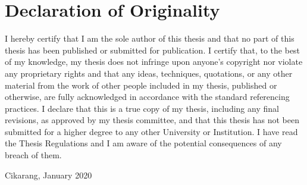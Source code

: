 \chapter*{Declaration of Originality}

I hereby certify that I am the sole author of this thesis and that no part of this thesis has been published or submitted for publication.
I certify that, to the best of my knowledge, my thesis does not infringe upon
anyone’s copyright nor violate any proprietary rights and that any ideas, techniques,
quotations, or any other material from the work of other people included in my thesis,
published or otherwise, are fully acknowledged in accordance with the standard
referencing practices.
I declare that this is a true copy of my thesis, including any final revisions, as
approved by my thesis committee, and that this thesis has not been submitted for a
higher degree to any other University or Institution.
I have read the Thesis Regulations and I am aware of the potential consequences
of any breach of them.

Cikarang, January 2020
\@author